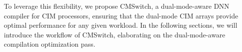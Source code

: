 
To leverage this flexibility, we propose CMSwitch, a dual-mode-aware DNN compiler for CIM processors, ensuring that the dual-mode CIM arrays provide optimal performance for any given workload.
In the following sections, we will introduce the workflow of CMSwitch, elaborating on the dual-mode-aware compilation optimization pass.